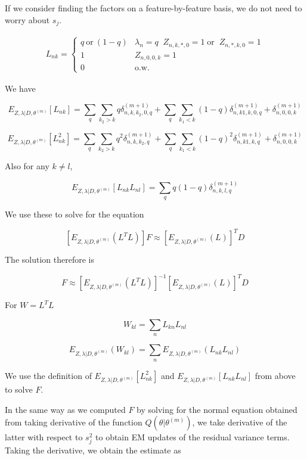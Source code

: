 \documentclass[12pt]{article}
\begin{document}
If we consider finding the factors on a feature-by-feature basis, we do not need to worry about $s_j$.

\begin{align*}
L_{nk} =
\begin{cases}
    q~\text{or}~(1-q) & \lambda_{n}=q  \; \; Z_{n,k,*, 0}=1 \; \text{or} \;\; Z_{n, *, k, 0} = 1 \\
    1 & Z_{n,0,0,k}=1 \\
    0 & \text{o.w.}
\end{cases}
\end{align*}

We have 

$$ E_{ Z, \lambda | D, \theta^{(m)}} \left [ L_{nk} \right ] = \sum_{q}  \sum_{k_2 > k} q \delta^{(m+1)}_{n, k, k_2, 0, q}  + \sum_{q}  \sum_{k_1 < k} (1-q) \delta^{(m+1)}_{n, k1, k, 0, q} +  \delta^{(m+1)}_{n, 0, 0, k} $$

$$ E_{ Z, \lambda | D, \theta^{(m)}} \left [ L^2_{nk} \right ] = \sum_{q}  \sum_{k_2 > k} q^2 \delta^{(m+1)}_{n,k,k_2, q}  + \sum_{q}  \sum_{k_1 < k} (1-q)^2 \delta^{(m+1)}_{n,k1,k,q} +  \delta^{(m+1)}_{n, 0, 0, k} $$

Also for any $k \neq l$,

$$ E_{ Z, \lambda | D, \theta^{(m)}} \left [ L_{nk}L_{nl} \right ] =
\sum_{q} q(1-q) \delta^{(m+1)}_{n,k,l,q} $$

We use these to solve for the equation

$$ \left [ E_{ Z, \lambda | D, \theta^{(m)}} \left( L^{T}L \right ) \right ] F \approx \left [ E_{ Z, \lambda | D, \theta^{(m)}} (L) \right] ^{T} D $$

The solution therefore is 

$$ F \approx \left [ E_{ Z, \lambda | D, \theta^{(m)}} \left( L^{T}L \right ) \right]^{-1} \left [ E_{ Z, \lambda | D, \theta^{(m)}} (L) \right]^{T} D $$

For $W = L^{T}L$

$$ W_{kl} = \sum_{n} L_{kn}L_{nl} $$

$$ E_{ Z, \lambda | D, \theta^{(m)}} \left ( W_{kl} \right ) = \sum_{n}  E_{ Z, \lambda | D, \theta^{(m)}} \left ( L_{nk}L_{nl} \right) $$

We use the definition of $E_{ Z, \lambda | D, \theta^{(m)}} \left [ L^2_{nk} \right ]$ 
and $E_{ Z, \lambda | D, \theta^{(m)}} \left [ L_{nk}L_{nl} \right ]$ 
from above to solve $F$. 

In the same way as we computed $F$ by solving for the normal equation obtained from taking derivative of the function $Q (\theta | \theta^{(m)})$, we take derivative of the latter with respect to $s^2_{j}$ to obtain EM updates of the residual variance terms. Taking the derivative, we obtain the estimate as 
\end{document}
